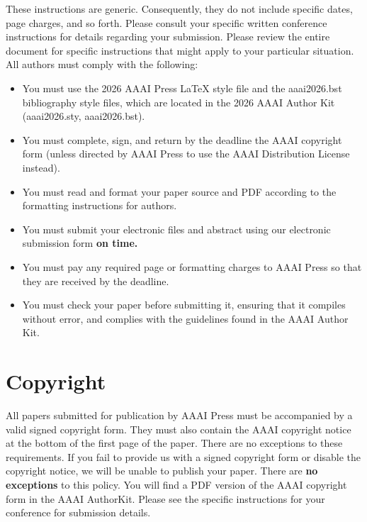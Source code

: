 \documentclass[letterpaper]{article} %
\begin{document}
These instructions are generic. Consequently, they do not include specific dates, page charges, and so forth. Please consult your specific written conference instructions for details regarding your submission. Please review the entire document for specific instructions that might apply to your particular situation. All authors must comply with the following:

\begin{itemize}
\item You must use the 2026 AAAI Press \LaTeX{} style file and the aaai2026.bst bibliography style files, which are located in the 2026 AAAI Author Kit (aaai2026.sty, aaai2026.bst).
\item You must complete, sign, and return by the deadline the AAAI copyright form (unless directed by AAAI Press to use the AAAI Distribution License instead).
\item You must read and format your paper source and PDF according to the formatting instructions for authors.
\item You must submit your electronic files and abstract using our electronic submission form \textbf{on time.}
\item You must pay any required page or formatting charges to AAAI Press so that they are received by the deadline.
\item You must check your paper before submitting it, ensuring that it compiles without error, and complies with the guidelines found in the AAAI Author Kit.
\end{itemize}

\section{Copyright}
All papers submitted for publication by AAAI Press must be accompanied by a valid signed copyright form. They must also contain the AAAI copyright notice at the bottom of the first page of the paper. There are no exceptions to these requirements. If you fail to provide us with a signed copyright form or disable the copyright notice, we will be unable to publish your paper. There are \textbf{no exceptions} to this policy. You will find a PDF version of the AAAI copyright form in the AAAI AuthorKit. Please see the specific instructions for your conference for submission details.
\end{document}
